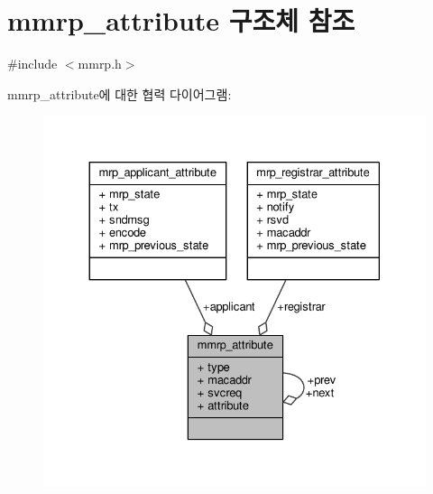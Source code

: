 \hypertarget{structmmrp__attribute}{}\section{mmrp\+\_\+attribute 구조체 참조}
\label{structmmrp__attribute}


{\ttfamily \#include $<$mmrp.\+h$>$}



mmrp\+\_\+attribute에 대한 협력 다이어그램\+:
\nopagebreak
\begin{figure}[H]
\begin{center}
\leavevmode
\includegraphics[width=330pt]{structmmrp__attribute__coll__graph}
\end{center}
\end{figure}
